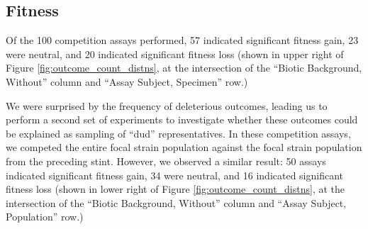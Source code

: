 

\subsection{Fitness}

% 



Of the 100 competition assays performed, 57 indicated significant fitness gain, 23 were neutral, and 20 indicated significant fitness loss (shown in upper right of Figure \ref{fig:outcome_count_distns}, at the intersection of the ``Biotic Background, Without'' column and ``Assay Subject, Specimen'' row.)

We were surprised by the frequency of deleterious outcomes, leading us to perform a second set of experiments to investigate whether these outcomes could be explained as sampling of ``dud'' representatives.
In these competition assays, we competed the entire focal strain population against the focal strain population from the preceding stint.
However, we observed a similar result: 50 assays indicated significant fitness gain, 34 were neutral, and 16 indicated significant fitness loss (shown in lower right of Figure \ref{fig:outcome_count_distns}, at the intersection of the ``Biotic Background, Without'' column and ``Assay Subject, Population'' row.)



